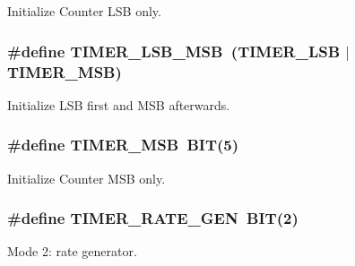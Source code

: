Initialize Counter L\+SB only. 

\subsubsection[{\texorpdfstring{T\+I\+M\+E\+R\+\_\+\+L\+S\+B\+\_\+\+M\+SB}{TIMER_LSB_MSB}}]{\setlength{\rightskip}{0pt plus 5cm}\#define T\+I\+M\+E\+R\+\_\+\+L\+S\+B\+\_\+\+M\+SB~({\bf T\+I\+M\+E\+R\+\_\+\+L\+SB} $\vert$ {\bf T\+I\+M\+E\+R\+\_\+\+M\+SB})}\hypertarget{group__i8254_ga8c0f1933323274c765e23837e4fbc8c7}{}\label{group__i8254_ga8c0f1933323274c765e23837e4fbc8c7}


Initialize L\+SB first and M\+SB afterwards. 

\subsubsection[{\texorpdfstring{T\+I\+M\+E\+R\+\_\+\+M\+SB}{TIMER_MSB}}]{\setlength{\rightskip}{0pt plus 5cm}\#define T\+I\+M\+E\+R\+\_\+\+M\+SB~{\bf B\+IT}(5)}\hypertarget{group__i8254_ga2a8a6d363c612d756cd8d78480f7cd04}{}\label{group__i8254_ga2a8a6d363c612d756cd8d78480f7cd04}


Initialize Counter M\+SB only. 

\subsubsection[{\texorpdfstring{T\+I\+M\+E\+R\+\_\+\+R\+A\+T\+E\+\_\+\+G\+EN}{TIMER_RATE_GEN}}]{\setlength{\rightskip}{0pt plus 5cm}\#define T\+I\+M\+E\+R\+\_\+\+R\+A\+T\+E\+\_\+\+G\+EN~{\bf B\+IT}(2)}\hypertarget{group__i8254_ga5d4449e0fa1cf4a4d107a48a04a1265f}{}\label{group__i8254_ga5d4449e0fa1cf4a4d107a48a04a1265f}


Mode 2\+: rate generator. 

